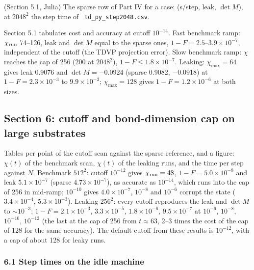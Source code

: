 \documentclass[11pt]{article}
\renewenvironment{function}[1]{\par\Needspace{7\baselineskip}\medskip\noindent{\raggedright\textbf{\large\texttt{\hyphenchar\font=-1 #1}}\par}\nopagebreak}{\par\medskip}
\renewcommand{\code}[1]{\texttt{\hyphenchar\font=-1 #1}}
\begin{document}
\begin{function}{sparse\_large(pt, L, rot)}
(Section 5.1, Julia) The sparse row of Part IV for a case: (s/step, leak, $\det M$), at $2048^2$ the step time of \code{td\_py\_step2048.csv}.
\end{function}
Section 5.1 tabulates cost and accuracy at cutoff $10^{-14}$. Fast benchmark ramp: $\chi_{\rm run}$ 74--126, leak and $\det M$ equal to the sparse ones,
$1-F = 2.5$--$3.9\times10^{-7}$, independent of the cutoff (the TDVP projection error). Slow benchmark ramp: $\chi$ reaches the cap of 256 (200 at
$2048^2$), $1-F\le1.8\times10^{-7}$. Leaking: $\chi_{\max} = 64$ gives leak 0.9076 and $\det M = -0.0924$ (sparse 0.9082, $-0.0918$) at $1-F = 2.3\times10^{-3}$ to
$9.9\times10^{-3}$; $\chi_{\max} = 128$ gives $1-F = 1.2\times10^{-6}$ at both sizes.

\subsection{Section 6: cutoff and bond-dimension cap on large substrates}
Tables per point of the cutoff scan against the sparse reference, and a figure: $\chi(t)$ of the benchmark scan, $\chi(t)$ of the leaking runs, and the
time per step against $N$. Benchmark $512^2$: cutoff $10^{-12}$ gives $\chi_{\rm run} = 48$, $1-F = 5.0\times10^{-8}$ and leak $5.1\times10^{-7}$ (sparse
$4.73\times10^{-7}$), as accurate as $10^{-14}$, which runs into the cap of 256 in mid-ramp; $10^{-10}$ gives $4.0\times10^{-7}$, $10^{-8}$ and $10^{-6}$ corrupt
the state ($3.4\times10^{-4}$, $5.3\times10^{-3}$). Leaking $256^2$: every cutoff reproduces the leak and $\det M$ to $\sim10^{-3}$; $1-F = 2.1\times10^{-3}$,
$3.3\times10^{-5}$, $1.8\times10^{-6}$, $9.5\times10^{-7}$ at $10^{-6}$, $10^{-8}$, $10^{-10}$, $10^{-12}$ (the last at the cap of 256 from $t\approx63$, 2--3 times
the cost of the cap of 128 for the same accuracy). The default cutoff from these results is $10^{-12}$, with a cap of about 128 for leaky
runs.

\subsubsection*{6.1 Step times on the idle machine}
\end{document}
